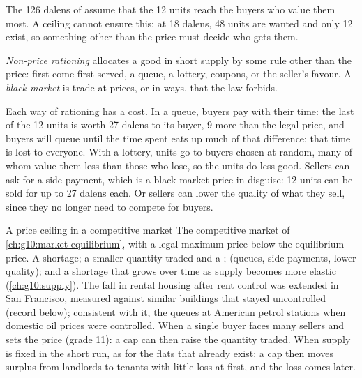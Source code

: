 The 126 dalens of  assume that the 12 units reach the buyers who value them most. A ceiling cannot ensure this: at 18 dalens, 48 units are wanted
and only 12 exist, so something other than the price must decide who gets them.

\begin{definition}\label{def:g10:what-prices-do:non-price-rationing}
\emph{Non-price rationing} allocates a good in short supply by some rule other than the price: first come first served, a queue, a
lottery, coupons, or the seller's favour. A \emph{black market} is trade at prices, or in ways, that the law forbids.
\end{definition}
\label{def:g10:what-prices-do:black-market}

Each way of rationing has a cost. In a queue, buyers pay with their time: the last of the 12 units is worth 27 dalens to its buyer, 9 more than the legal
price, and buyers will queue until the time spent eats up much of that difference; that time is lost to everyone. With a lottery, units go to buyers chosen at
random, many of whom value them less than those who lose, so the units do less good. Sellers can ask for a side payment, which is a black-market price in
disguise: 12 units can be sold for up to 27 dalens each. Or sellers can lower the quality of what they sell, since they no longer need to compete for buyers.

\begin{model}{A price ceiling in a competitive market}
\assumes The competitive market of \cref{ch:g10:market-equilibrium}, with a legal maximum price below the equilibrium price.
\predicts A shortage; a smaller quantity traded and a ;  (queues, side payments, lower quality); and a shortage that grows over
  time as supply becomes more elastic (\cref{ch:g10:supply}).
\tested The fall in rental housing after rent control was extended in San Francisco, measured against similar buildings that stayed uncontrolled (record
  below); consistent with it, the queues at American petrol stations when domestic oil prices were controlled.
\breaks When a single buyer faces many sellers and sets the price (grade 11): a cap can then raise the quantity traded. When supply is fixed in the short run, as for
  the flats that already exist: a cap then moves surplus from landlords to tenants with little loss at first, and the loss comes later.
\end{model}

